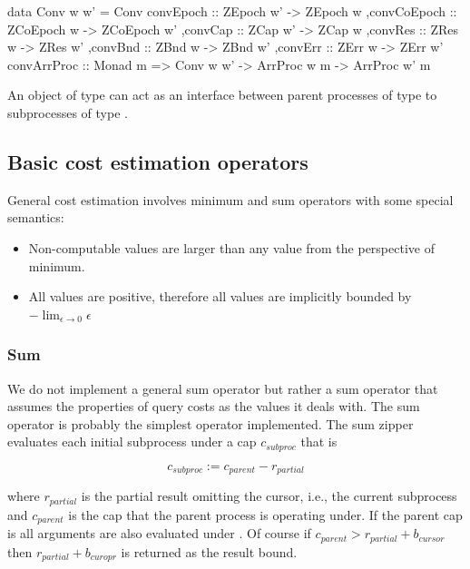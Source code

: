 \begin{code}
\begin{haskellcode}
data Conv w w' =
  Conv
  { convEpoch :: ZEpoch w' -> ZEpoch w
   ,convCoEpoch :: ZCoEpoch w -> ZCoEpoch w'
   ,convCap :: ZCap w' -> ZCap w
   ,convRes :: ZRes w -> ZRes w'
   ,convBnd :: ZBnd w -> ZBnd w'
   ,convErr :: ZErr w -> ZErr w'
  }
convArrProc :: Monad m => Conv w w' -> ArrProc w m -> ArrProc w' m
\end{haskellcode}
  \caption{\label{lst:conv_def}An object of type  can
    act as an interface between parent processes of type  to
    subprocesses of type .}
\end{code}


\subsection{Basic cost estimation operators}
\label{sec:basic_cost_ops}

General cost estimation involves minimum and sum operators with some
special semantics:

\begin{itemize}
\item Non-computable values are larger than any value from the
  perspective of minimum.
\item All values are positive, therefore all values are implicitly
  bounded by \(- \lim_{\epsilon \to 0} \epsilon\)
\end{itemize}

\subsubsection{Sum}

We do not implement a general sum operator but rather a sum operator
that assumes the properties of query costs as the values it deals
with. The sum operator is probably the simplest operator implemented. The
sum zipper evaluates each initial subprocess under a cap \(c_{subproc}\) that is

\[
c_{subproc} := c_{parent} - r_{partial}
\]

where \(r_{partial}\) is the partial result omitting the cursor, i.e.,
the current subprocess and \(c_{parent}\) is the cap that the parent
process is operating under. If the parent cap is  all
arguments are also evaluated under . Of course if
\(c_{parent} > r_{partial} + b_{cursor}\) then \(r_{partial} +
b_{curopr}\) is returned as the result bound.

